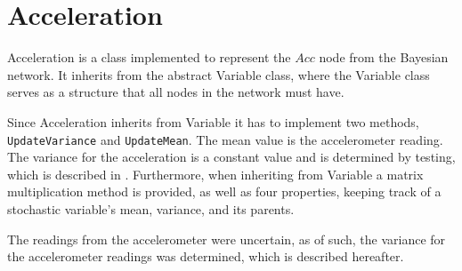 \section{Acceleration}
Acceleration is a class implemented to represent the $Acc$ node from the Bayesian network. It inherits from the abstract Variable class, where the Variable class serves as a structure that all nodes in the network must have.

Since Acceleration inherits from Variable it has to implement two methods, \lstinline$UpdateVariance$ and \lstinline$UpdateMean$.
The mean value is the accelerometer reading.
The variance for the acceleration is a constant value and is determined by testing, which is described in .
Furthermore, when inheriting from Variable a matrix multiplication method is provided, as well as four properties, keeping track of a stochastic variable's mean, variance, and its parents.

The readings from the accelerometer were uncertain, as of such, the variance for the accelerometer readings was determined, which is described hereafter.

